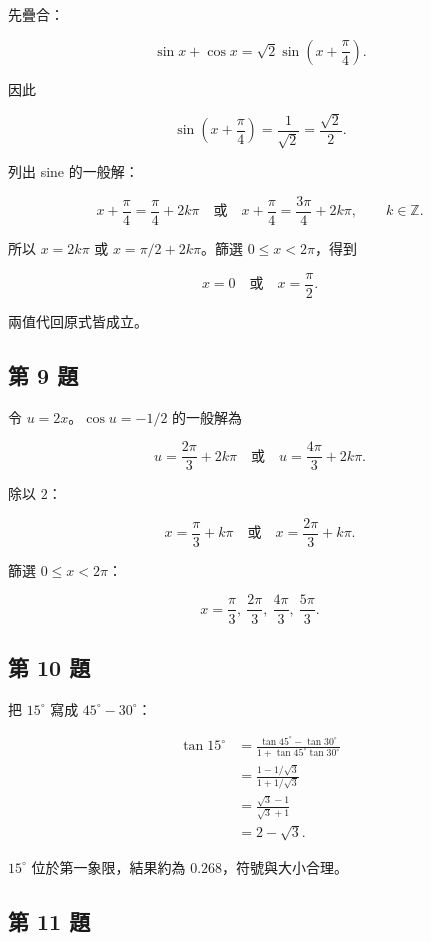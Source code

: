 \documentclass[11pt,a4paper]{article}
\begin{document}
先疊合：

\[
\sin x+\cos x
=\sqrt2\sin\left(x+\frac\pi4\right).
\]

因此

\[
\sin\left(x+\frac\pi4\right)=\frac{1}{\sqrt2}=\frac{\sqrt2}{2}.
\]

列出 sine 的一般解：

\[
x+\frac\pi4=\frac\pi4+2k\pi
\quad\text{或}\quad
x+\frac\pi4=\frac{3\pi}{4}+2k\pi,
\qquad k\in\mathbb Z.
\]

所以 \(x=2k\pi\) 或 \(x=\pi/2+2k\pi\)。篩選 \(0\le x<2\pi\)，得到

\[
\boxed{x=0\quad\text{或}\quad x=\frac\pi2}.
\]

兩值代回原式皆成立。

\subsection{第 9 題}\label{ux7b2c-9-ux984c}

令 \(u=2x\)。\(\cos u=-1/2\) 的一般解為

\[
u=\frac{2\pi}{3}+2k\pi
\quad\text{或}\quad
u=\frac{4\pi}{3}+2k\pi.
\]

除以 \(2\)：

\[
x=\frac\pi3+k\pi
\quad\text{或}\quad
x=\frac{2\pi}{3}+k\pi.
\]

篩選 \(0\le x<2\pi\)：

\[
\boxed{x=\frac\pi3,\ \frac{2\pi}{3},\ \frac{4\pi}{3},\ \frac{5\pi}{3}}.
\]

\subsection{第 10 題}\label{ux7b2c-10-ux984c}

把 \(15^\circ\) 寫成 \(45^\circ-30^\circ\)：

\[
\begin{aligned}
\tan15^\circ
&=\frac{\tan45^\circ-\tan30^\circ}
{1+\tan45^\circ\tan30^\circ}\\
&=\frac{1-1/\sqrt3}{1+1/\sqrt3}\\
&=\frac{\sqrt3-1}{\sqrt3+1}\\
&=\boxed{2-\sqrt3}.
\end{aligned}
\]

\(15^\circ\) 位於第一象限，結果約為 \(0.268\)，符號與大小合理。

\subsection{第 11 題}\label{ux7b2c-11-ux984c}
\end{document}
